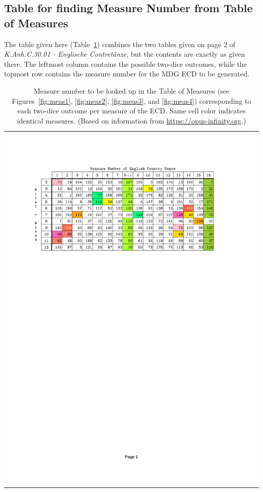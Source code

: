 \documentclass[letterpaper,x11names,svgnames,10pt]{article}
\begin{document}
\subsection{Table for finding Measure Number from Table of Measures}\label{tableFind}
The table given here (Table~\ref{fig:0tab1}) combines the two tables given on page 2 of {\it K.Anh.C.30.01 - Englische Contret\"{a}nze}, but the contents are exactly as given there.  The leftmost column contains the possible two-dice outcomes, while the topmost row contains the measure number for the MDG ECD to be generated.

\begin{table}[H]
	\centering
	\begin{tabular}{c}
		\centering
		\includegraphics[clip=true,trim=0.90in 7.75in 1.25in 1.00in,scale=0.90]{0TAB1ECc}
	\end{tabular}
	\caption{Measure number to be looked up in the Table of Measures (see Figures~\ref{fig:meas1}, \ref{fig:meas2}, \ref{fig:meas3}, and \ref{fig:meas4}) corresponding to each two-dice outcome per measure of the ECD. Same cell color indicates identical measures. (Based on information from \href{https://opus-infinity.org/dice_games/mozart_contredanse/tables/}{https://opus-infinity.org}.)}
	\label{fig:0tab1}
\end{table}
\end{document}
